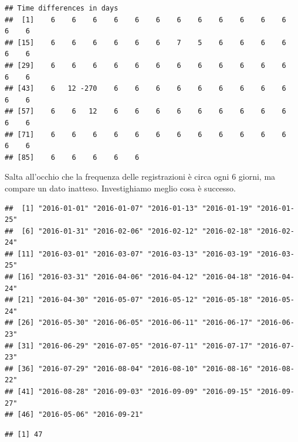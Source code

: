 \documentclass[]{book}
\newenvironment{Shaded}{\begin{snugshade}}{\end{snugshade}}
\newcommand{\KeywordTok}[1]{\textcolor[rgb]{0.13,0.29,0.53}{\textbf{#1}}}
\newcommand{\NormalTok}[1]{#1}
\newcommand{\OperatorTok}[1]{\textcolor[rgb]{0.81,0.36,0.00}{\textbf{#1}}}
\begin{document}
\begin{verbatim}
## Time differences in days
##  [1]    6    6    6    6    6    6    6    6    6    6    6    6    6    6
## [15]    6    6    6    6    6    6    7    5    6    6    6    6    6    6
## [29]    6    6    6    6    6    6    6    6    6    6    6    6    6    6
## [43]    6   12 -270    6    6    6    6    6    6    6    6    6    6    6
## [57]    6    6   12    6    6    6    6    6    6    6    6    6    6    6
## [71]    6    6    6    6    6    6    6    6    6    6    6    6    6    6
## [85]    6    6    6    6    6
\end{verbatim}

Salta all'occhio che la frequenza delle registrazioni è circa ogni 6 giorni, ma compare un dato inatteso. Investighiamo meglio cosa è successo.

\begin{Shaded}
\end{Shaded}

\begin{verbatim}
##  [1] "2016-01-01" "2016-01-07" "2016-01-13" "2016-01-19" "2016-01-25"
##  [6] "2016-01-31" "2016-02-06" "2016-02-12" "2016-02-18" "2016-02-24"
## [11] "2016-03-01" "2016-03-07" "2016-03-13" "2016-03-19" "2016-03-25"
## [16] "2016-03-31" "2016-04-06" "2016-04-12" "2016-04-18" "2016-04-24"
## [21] "2016-04-30" "2016-05-07" "2016-05-12" "2016-05-18" "2016-05-24"
## [26] "2016-05-30" "2016-06-05" "2016-06-11" "2016-06-17" "2016-06-23"
## [31] "2016-06-29" "2016-07-05" "2016-07-11" "2016-07-17" "2016-07-23"
## [36] "2016-07-29" "2016-08-04" "2016-08-10" "2016-08-16" "2016-08-22"
## [41] "2016-08-28" "2016-09-03" "2016-09-09" "2016-09-15" "2016-09-27"
## [46] "2016-05-06" "2016-09-21"
\end{verbatim}

\begin{Shaded}
\end{Shaded}

\begin{verbatim}
## [1] 47
\end{verbatim}
\end{document}
